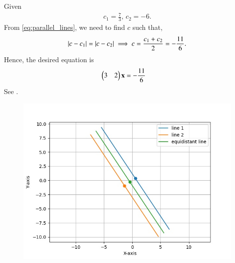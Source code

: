 Given
\begin{align}
	c_1 = \frac{7}{3},\,
c_2 = -6.
\end{align}
	From \eqref{eq:parallel_lines},
we need to find $c$ such that,
\begin{align}
	\left\vert c-c_1\right\vert = \left\vert c-c_2\right\vert \implies c = \frac{c_1+c_2}{2}
	 = -\frac{11}{6}.
\end{align}
Hence, the desired equation is
\begin{align}
	\begin{pmatrix}3 & 2\end{pmatrix}\mathbf{x} &= -\frac{11}{6}
\end{align}
	See .
\begin{figure}[!ht]
	\centering
	\includegraphics[width = \columnwidth]{chapters/11/10/4/21/figs/line_plot.jpg}
	\caption{}
	\label{fig:chapters/11/10/4/21/1}
\end{figure}
